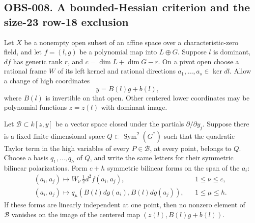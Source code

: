 \subsection*{OBS-008. A bounded-Hessian criterion and the size-23 row-18 exclusion}
Let $X$ be a nonempty open subset of an affine space over a
characteristic-zero field, and let $f=(l,g)$ be a polynomial map into
$L\oplus G$.  Suppose $l$ is dominant, $df$ has generic rank $r$,
and $c=\dim L+\dim G-r$.  On a pivot open choose a rational frame
$W$ of its left kernel and rational directions
$a_1,\ldots,a_s\in\ker dl$.
Allow a change of high coordinates
\[
                         y=B(l)g+b(l),
\]
where $B(l)$ is invertible on that open.  Other centered lower
coordinates may be polynomial functions $z=z(l)$ with dominant
image.

Let $\mathcal B\subset k[z,y]$ be a vector space closed under the
partials $\partial/\partial y_j$.  Suppose there is a fixed
finite-dimensional space $Q\subset\operatorname{Sym}^2(G^*)$
such that the quadratic Taylor term in the high variables of every
$P\in\mathcal B$, at every point, belongs to $Q$.  Choose a basis
$q_1,\ldots,q_h$ of $Q$, and write the same letters for their symmetric
bilinear polarizations.  Form $c+h$ symmetric bilinear forms on the
span of the $a_i$:
\[
 \begin{aligned}
  &(a_i,a_j)\longmapsto W_\nu\,\tfrac12d^2f(a_i,a_j),
                    &&1\leq\nu\leq c,\\
  &(a_i,a_j)\longmapsto q_\mu(B(l)dg(a_i),B(l)dg(a_j)),
                    &&1\leq\mu\leq h.
 \end{aligned}                                                 \tag{BH-1}
\]
If these forms are linearly independent at one point, then no nonzero
element of $\mathcal B$ vanishes on the image of the centered map
$(z(l),B(l)g+b(l))$.


